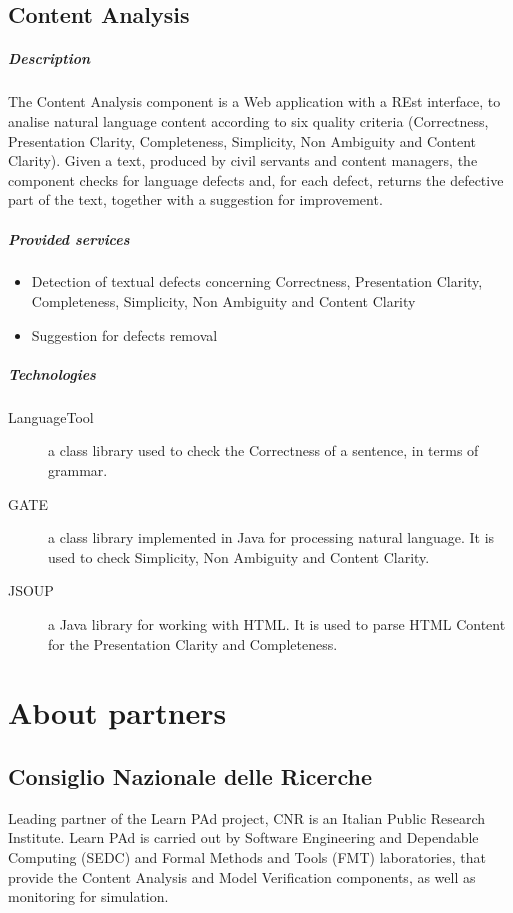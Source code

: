 \documentclass{learnpad}
\begin{document}
\section{Content Analysis}\label{sec:content-analysis}
\paragraph{Description}
The Content Analysis component is a Web application with a REst interface, to
analise natural language content according to six quality criteria (Correctness,
Presentation Clarity, Completeness, Simplicity, Non Ambiguity and Content
Clarity). Given a text, produced by civil servants and content managers, the
component checks for language defects and, for each defect, returns the
defective part of the text, together with a suggestion for improvement.

\paragraph{Provided services}
\begin{itemize}
	\item Detection of textual defects concerning Correctness, Presentation Clarity, Completeness, Simplicity, Non Ambiguity and Content Clarity
	\item Suggestion for defects removal
\end{itemize}

\paragraph{Technologies}
\begin{description}
	\item[LanguageTool] a class library used to check the Correctness of a sentence, in terms of grammar.
	\item[GATE] a class library implemented in Java for processing natural language. It is used to check Simplicity, Non Ambiguity and Content Clarity.
	\item[JSOUP] a Java library for working with HTML. It is used to parse HTML Content for the Presentation Clarity and Completeness.
\end{description}

\chapter{About partners}
\label{ch:partners}

\section{Consiglio Nazionale delle Ricerche}
Leading partner of the Learn PAd project, CNR is an Italian Public Research
Institute.  Learn PAd is carried out by Software Engineering and Dependable
Computing (SEDC) and Formal Methods and Tools (FMT) laboratories, that provide
the Content Analysis and Model Verification components, as well as monitoring
for simulation.
\end{document}
